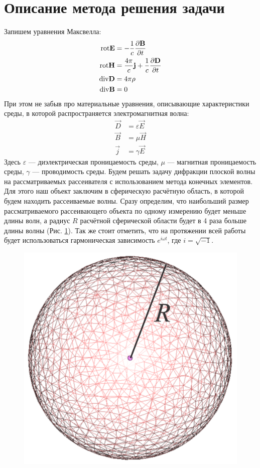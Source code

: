\section{Описание метода решения задачи}
Запишем уравнения Максвелла:
\begin{align}
 {\rm rot}\vec{E} &= -\dfrac{1}{c}\dfrac{\partial \vec{B}}{\partial t} \\
 \rm rot\vec{H} &=\dfrac{4\pi}{c}\vec{j} + \dfrac{1}{c}\dfrac{\partial \vec{D}}{\partial t} \\
 \rm div\vec{D} &= 4\pi \rho \\
 \rm div\vec{B} &= 0 
\end{align}
При этом не забыв про материальные уравнения, описывающие характеристики среды, в которой распространяется электромагнитная волна:
\begin{align}
	   \vec{D} &= \varepsilon \vec{E}\\
	   \vec{B} &= \mu \vec{H} \\
	   \vec{j} &= \gamma \vec{E}
\end{align}
Здесь $\varepsilon$ --- диэлектрическая проницаемость среды, $\mu$ --- магнитная проницаемость среды, $\gamma$ --- проводимость среды. Будем решать задачу дифракции плоской волны на рассматриваемых рассеивателя с использованием метода конечных элементов. Для этого наш объект заключим в сферическую расчётную область, в которой будем находить рассеиваемые волны. Сразу определим, что наибольший размер рассматриваемого рассеивающего объекта по одному измерению будет меньше длины волн, а радиус $R$ расчётной сферической области будет в 4 раза больше длины волны (Рис. \ref{fig:ces1}). Так же стоит отметить, что на протяжении всей работы будет использоваться гармоническая зависимость $ e^{i \omega t} $, где $ i = \sqrt{-1} $. 

\begin{figure}[h!]
	\centering
	\includegraphics[width=0.4\linewidth]{ces1}
	\caption{}
	\label{fig:ces1}
\end{figure}


